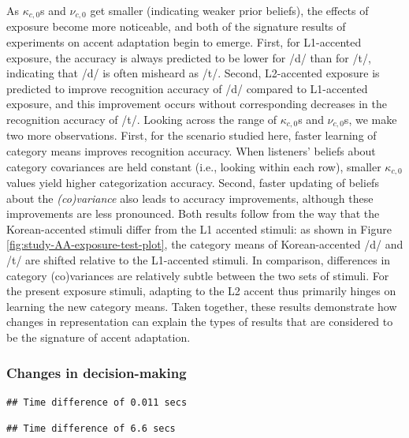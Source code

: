 \documentclass[
  11pt,
  man,floatsintext]{apa6}
\begin{document}
As \(\kappa_{c,0}\)s and \(\nu_{c,0}\) get smaller (indicating weaker prior beliefs), the effects of exposure become more noticeable, and both of the signature results of experiments on accent adaptation begin to emerge. First, for L1-accented exposure, the accuracy is always predicted to be lower for /d/ than for /t/, indicating that /d/ is often misheard as /t/. Second, L2-accented exposure is predicted to improve recognition accuracy of /d/ compared to L1-accented exposure, and this improvement occurs without corresponding decreases in the recognition accuracy of /t/. Looking across the range of \(\kappa_{c,0}\)s and \(\nu_{c,0}\)s, we make two more observations. First, for the scenario studied here, faster learning of category means improves recognition accuracy. When listeners' beliefs about category covariances are held constant (i.e., looking within each row), smaller \(\kappa_{c,0}\) values yield higher categorization accuracy. Second, faster updating of beliefs about the \emph{(co)variance} also leads to accuracy improvements, although these improvements are less pronounced. Both results follow from the way that the Korean-accented stimuli differ from the L1 accented stimuli: as shown in Figure \ref{fig:study-AA-exposure-test-plot}, the category means of Korean-accented /d/ and /t/ are shifted relative to the L1-accented stimuli. In comparison, differences in category (co)variances are relatively subtle between the two sets of stimuli. For the present exposure stimuli, adapting to the L2 accent thus primarily hinges on learning the new category means. Taken together, these results demonstrate how changes in representation can explain the types of results that are considered to be the signature of accent adaptation.

\hypertarget{changes-in-decision-making-1}{%
\subsubsection{Changes in decision-making}\label{changes-in-decision-making-1}}

\begin{verbatim}
## Time difference of 0.011 secs
\end{verbatim}

\begin{verbatim}
## Time difference of 6.6 secs
\end{verbatim}
\end{document}
